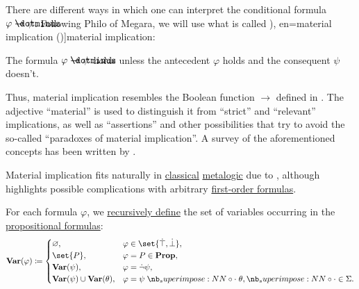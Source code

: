 \begin{remark}\label{rem:material_implication}
  There are different ways in which one can interpret the conditional formula \( \varphi \synimplies \psi \). Following Philo of Megara, we will use what is called \term[ru=материальная импликация (\cite[74]{КолмогоровДрагалин2006}), en=material implication (\cite[6]{VanDalen2004})]{material implication}:
  \begin{displayquote}
    The formula \( \varphi \synimplies \psi \) holds unless the antecedent \( \varphi \) holds and the consequent \( \psi \) doesn't.
  \end{displayquote}

  Thus, material implication resembles the Boolean function \( {\rightarrow} \) defined in . The adjective \enquote{material} is used to distinguish it from \enquote{strict} and \enquote{relevant} implications, as well as \enquote{assertions} and other possibilities that try to avoid the so-called \enquote{paradoxes of material implication}. A survey of the aforementioned concepts has been written by .

  Material implication fits naturally in \hyperref[def:classical_logic]{classical} \hyperref[con:metalogic]{metalogic} due to , although  highlights possible complications with arbitrary \hyperref[def:first_order_syntax/formula]{first-order formulas}.
\end{remark}

\begin{definition}\label{def:propositional_formula_variables}\mimprovised
  For each formula \( \varphi \), we \hyperref[con:evaluation]{recursively define} the set of variables occurring in the \hyperref[def:propositional_grammar_schema/formula]{propositional formulas}:
  \begin{equation*}
    \boldop{Var}(\varphi) \coloneqq \begin{cases}
      \varnothing,                                  &\varphi \in \set{ \syntop, \synbot }, \\
      \set{ P },                                    &\varphi = P \in \boldop{Prop}, \\
      \boldop{Var}(\psi),                           &\varphi = \synneg \psi, \\
      \boldop{Var}(\psi) \cup \boldop{Var}(\theta), &\varphi = \psi \syncirc \theta, {\syncirc} \in \Sigma.
    \end{cases}
  \end{equation*}
\end{definition}

